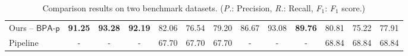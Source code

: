 \begin{table}[th]
{\begin{tabular}{l||ccc|ccc||ccc|ccc}
			Ours -- $\mathsf{BPA}$-$\mathsf{p}$ & \textbf{91.25} & \textbf{93.28} & \textbf{92.19} & 82.06 & 76.54 & 79.20 & 86.67 & 93.08 & \textbf{89.76} & 80.81 & 75.22 &77.91 \\
			\hdashline 
			Pipeline & - & - & - & 67.70 & 67.70 & 67.70 & - & - & - & 68.84 & 68.84 & 68.84 \\ 
			
		\end{tabular}
	}
	\vspace{-2mm}
	\caption{Comparison results on two benchmark datasets. ({\em P.}: Precision, {\em R.}: Recall, {\em F$_1$}: {\em F}$_1$ score.)}
	\label{tab:result}
	\vspace{-5mm}
\end{table}
